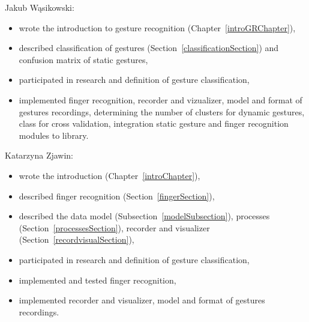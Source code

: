 Jakub Wąsikowski:
\begin {itemize}
\item wrote the introduction to gesture recognition (Chapter~\ref{introGRChapter}),
\item described classification of gestures (Section~\ref{classificationSection}) and confusion matrix of static gestures,
\item participated in research and definition of gesture classification,
\item implemented finger recognition, recorder and vizualizer, model and format of gestures recordings, determining the number of clusters for dynamic gestures, class for cross validation, integration static gesture and finger recognition modules to library.
\end{itemize}

Katarzyna Zjawin: 
\begin{itemize}
\item wrote the introduction (Chapter~\ref{introChapter}),
\item described finger recognition (Section~\ref{fingerSection}),
\item described the data model (Subsection~\ref{modelSubsection}), processes (Section~\ref{processesSection}), recorder and visualizer (Section~\ref{recordvisualSection}),
\item participated in research and definition of gesture classification,
\item implemented and tested finger recognition,
\item implemented recorder and visualizer, model and format of gestures recordings.
\end{itemize}


